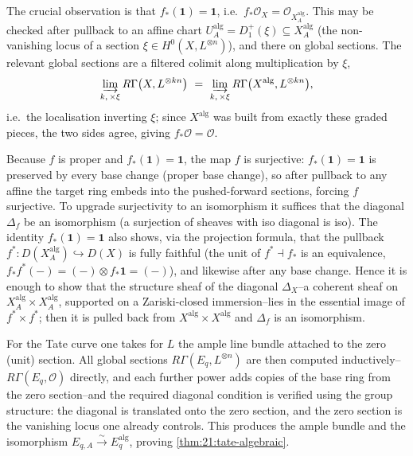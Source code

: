 \begin{remark}[$f_*\mathcal O=\mathcal O$]
\label{rmk:21:pushforward-unit}
The crucial observation is that $f_*(\mathbf 1)=\mathbf 1$, i.e.\
$f_*\mathcal O_X=\mathcal O_{X^{\mathrm{alg}}_A}$. This may be checked after
pullback to an affine chart $U^{\mathrm{alg}}_A=D^{+}_1(\xi)\subseteq
X^{\mathrm{alg}}_A$ (the non-vanishing locus of a section
$\xi\in H^0(X,L^{\otimes n})$), and there on global sections. The relevant global
sections are a filtered colimit along multiplication by $\xi$,
\begin{equation*}
\varinjlim_{k,\,\times\xi} R\Gamma\bigl(X,L^{\otimes kn}\bigr)\ =\
\varinjlim_{k,\,\times\xi} R\Gamma\bigl(X^{\mathrm{alg}},L^{\otimes kn}\bigr),
\end{equation*}
i.e.\ the localisation inverting $\xi$; since $X^{\mathrm{alg}}$ was built from
exactly these graded pieces, the two sides agree, giving $f_*\mathcal O=\mathcal O$.
\end{remark}

\begin{remark}[From $f_*\mathcal O=\mathcal O$ to an isomorphism]
\label{rmk:21:iso-criterion}
Because $f$ is proper and $f_*(\mathbf 1)=\mathbf 1$, the map $f$ is surjective:
$f_*(\mathbf 1)=\mathbf 1$ is preserved by every base change (proper base change),
so after pullback to any affine the target ring embeds into the pushed-forward
sections, forcing $f$ surjective. To upgrade surjectivity to an isomorphism it
suffices that the diagonal $\Delta_f$ be an isomorphism (a surjection of sheaves
with iso diagonal is iso). The identity $f_*(\mathbf 1)=\mathbf 1$ also shows,
via the projection formula, that the pullback
$f^{*}\colon D(X^{\mathrm{alg}}_A)\hookrightarrow D(X)$ is fully faithful (the
unit of $f^{*}\dashv f_{*}$ is an equivalence, $f_*f^{*}(-)=(-)\otimes f_*\mathbf 1
=(-)$), and likewise after any base change. Hence it is enough to show that the
structure sheaf of the diagonal $\Delta_X$--a coherent sheaf on
$X^{\mathrm{alg}}_A\times X^{\mathrm{alg}}_A$, supported on a Zariski-closed
immersion--lies in the essential image of $f^{*}\times f^{*}$; then it is pulled
back from $X^{\mathrm{alg}}\times X^{\mathrm{alg}}$ and $\Delta_f$ is an
isomorphism.
\end{remark}

\begin{remark}
\label{rmk:21:tate-algebraisation}
For the Tate curve one takes for $L$ the ample line bundle attached to the zero
(unit) section. All global sections $R\Gamma(E_q,L^{\otimes n})$ are then
computed inductively--$R\Gamma(E_q,\mathcal O)$ directly, and each further power
adds copies of the base ring from the zero section--and the required diagonal
condition is verified using the group structure: the diagonal is translated onto
the zero section, and the zero section is the vanishing locus one already
controls. This produces the ample bundle and the isomorphism
$E_{q,A}\xrightarrow{\sim}E_q^{\mathrm{alg}}$, proving
\cref{thm:21:tate-algebraic}.
\end{remark}

